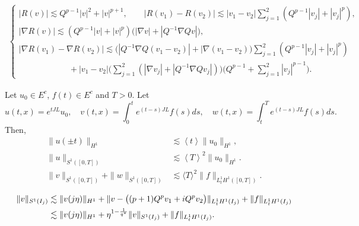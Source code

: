 \documentclass[10pt,a4paper]{amsart}
\newcommand{\lsm}{\lesssim}
\begin{document}
\begin{align}\label{R2}
\begin{cases}
|R(v)|\lsm Q^{p-1}|v|^2+ |v|^{p+1}, \qquad |R(v_1)-R(v_2)|\lsm |v_1-v_2|\sum_{j=1}^2(Q^{p-1}|v_j|+|v_j|^p), \\
|\nabla R(v)|\lsm (Q^{p-1}|v|+|v|^p) \bigl(|\nabla v|+|Q^{-1}\nabla Q v|\bigr),\\
|\nabla R(v_1)-\nabla R(v_2)|\lsm  \bigl(|Q^{-1}\nabla Q (v_1-v_2)|+|\nabla (v_1-v_2)\bigr)\sum_{j=1}^2(Q^{p-1}|v_j|+ |v_j|^p)\\
\qquad \qquad\qquad+|v_1-v_2|\big(\sum_{j=1}^2 (|\nabla v_j|  +|Q^{-1}\nabla Q v_j|)\big)
\bigl(Q^{p-1}+\sum_{j=1}^2|v_j|^{p-1}\bigr). 
\end{cases}
\end{align}

\begin{lemma}\label{Lemma3.1}
	Let $u_0\in E^c$, $f(t)\in E^c$ and $T>0$. Let 
\[u(t,x)=e^{tJL} u_0, \quad v(t,x)=\int_0^t e^{(t-s)JL}f(s)ds,\quad w(t,x)=\int_t^T e^{(t-s)JL}f(s)ds.\]
Then,  
	\begin{align}
		\|u(\pm t)\|_{ H^1} &\lesssim \left\langle t \right\rangle \|u_0\|_{ H^1}, \label{H1bd}\\
		\|u\|_{ S^1([0,T])} &\lesssim \left\langle T \right \rangle^2 \|u_0\|_{ H^1}. \label{local u}\\
		\|v\|_{ S^1([0,T])}+\|w\|_{ S^1([0,T])}&\lsm \langle T\rangle ^2 \|f\|_{L_t^1 H^1([0,T])}. \label{918}
	\end{align}
\end{lemma}

	\begin{align}
		\|v\|_{ S^1(I_j)} &\lesssim \|v(j\eta)\|_{H^1} + \|v-\bigl((p+1)Q^p v_1 +iQ^pv_2\bigr)\|_{L_t^1 H^1(I_j)}
                  +\|f\|_{L_t^1H^1(I_j)}\label{JJ6} \\
		&\lesssim \|v(j\eta)\|_{H^1} +\eta^{1-\frac 1{q^*}}\|v\|_{ S^1(I_j)} +\|f\|_{L_t^1H^1(I_j)}. \notag
	\end{align}
\end{document}
